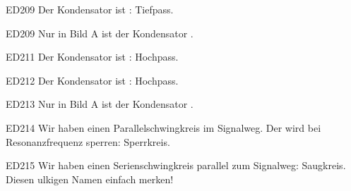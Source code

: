 \begin{sol}{ED209}
 Der Kondensator ist : Tiefpass.
\end{sol}

\begin{sol}{ED209}
 Nur in Bild A ist der Kondensator .
\end{sol}


\begin{sol}{ED211}
 Der Kondensator ist : Hochpass.
\end{sol}

\begin{sol}{ED212}
 Der Kondensator ist : Hochpass.
\end{sol}

\begin{sol}{ED213}
 Nur in Bild A ist der Kondensator .
\end{sol}

\begin{sol}{ED214}
 Wir haben einen Parallelschwingkreis im Signalweg. Der wird bei Resonanzfrequenz sperren: Sperrkreis.
\end{sol}


\begin{sol}{ED215}
 Wir haben einen Serienschwingkreis parallel zum Signalweg: Saugkreis. Diesen ulkigen Namen einfach merken!
\end{sol}

